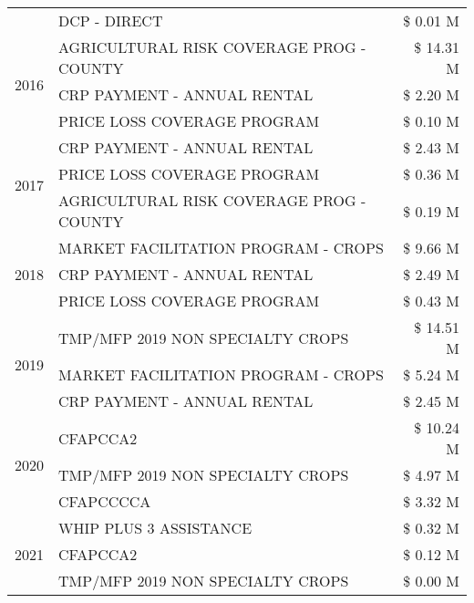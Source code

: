 \begin{tabular}{llr}
 & DCP - DIRECT & \$ 0.01 M \\
\cline{1-3}
\multirow[t]{3}{*}{2016} & AGRICULTURAL RISK COVERAGE PROG - COUNTY      & \$ 14.31 M \\
 & CRP PAYMENT - ANNUAL RENTAL                   & \$ 2.20 M \\
 & PRICE LOSS COVERAGE PROGRAM                   & \$ 0.10 M \\
\cline{1-3}
\multirow[t]{3}{*}{2017} & CRP PAYMENT - ANNUAL RENTAL & \$ 2.43 M \\
 & PRICE LOSS COVERAGE PROGRAM & \$ 0.36 M \\
 & AGRICULTURAL RISK COVERAGE PROG - COUNTY & \$ 0.19 M \\
\cline{1-3}
\multirow[t]{3}{*}{2018} & MARKET FACILITATION PROGRAM - CROPS & \$ 9.66 M \\
 & CRP PAYMENT - ANNUAL RENTAL & \$ 2.49 M \\
 & PRICE LOSS COVERAGE PROGRAM & \$ 0.43 M \\
\cline{1-3}
\multirow[t]{3}{*}{2019} & TMP/MFP 2019 NON SPECIALTY CROPS & \$ 14.51 M \\
 & MARKET FACILITATION PROGRAM - CROPS & \$ 5.24 M \\
 & CRP PAYMENT - ANNUAL RENTAL & \$ 2.45 M \\
\cline{1-3}
\multirow[t]{3}{*}{2020} & CFAPCCA2 & \$ 10.24 M \\
 & TMP/MFP 2019 NON SPECIALTY CROPS & \$ 4.97 M \\
 & CFAPCCCCA & \$ 3.32 M \\
\cline{1-3}
\multirow[t]{3}{*}{2021} & WHIP PLUS 3 ASSISTANCE & \$ 0.32 M \\
 & CFAPCCA2 & \$ 0.12 M \\
 & TMP/MFP 2019 NON SPECIALTY CROPS & \$ 0.00 M \\
\cline{1-3}
\bottomrule
\end{tabular}
